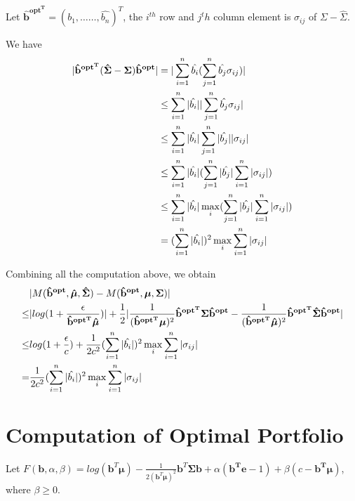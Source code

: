 \documentclass{gapd}
\begin{document}
Let $\mathbf{\hat{b}^{{opt}^T}}=(\hat{b_1},\dots \dots,\hat{b_n})^T$, the $i^{th}$  row and $j^th$  column element is $\sigma_{ij}$ of $\Sigma-\hat{\Sigma}$.

We have
\begin{equation}
\begin{aligned}
|\mathbf{\hat{b}^{{opt}^T}}(\boldsymbol{\hat{\Sigma}}-\boldsymbol{\Sigma})\mathbf{\hat{b}^{opt}}|&=|\sum_{i=1}^n \hat{b_i}(\sum_{j=1}^n\hat{b_j}\sigma_{ij})|\\
& \le \sum_{i=1}^n |\hat{b_i}| |\sum_{j=1}^n\hat{b_j}\sigma_{ij}|\\
& \le \sum_{i=1}^n |\hat{b_i}| \sum_{j=1}^n|\hat{b_j}||\sigma_{ij}|\\
& \le \sum_{i=1}^n |\hat{b_i}| (\sum_{j=1}^n|\hat{b_j}|\sum_{i=1}^n|\sigma_{ij}|)\\
& \le \sum_{i=1}^n |\hat{b_i}| \max_i(\sum_{j=1}^n|\hat{b_j}|\sum_{i=1}^n|\sigma_{ij}|)\\
& = (\sum_{i=1}^n |\hat{b_i}|)^2 \max_i \sum_{i=1}^n|\sigma_{ij}|
\end{aligned}\notag
\end{equation}

Combining all the computation above, we obtain
\begin{equation}
\begin{aligned}
&|M(\mathbf{\hat{b}^{opt}},\boldsymbol{\hat{\mu}},\boldsymbol{\hat{\Sigma}})-M(\mathbf{\hat{b}^{opt}},\boldsymbol{\mu},\boldsymbol{\Sigma})|\\
\le &|log(1+\frac{\epsilon}{\mathbf{\hat{b}^{{opt}^T}} \boldsymbol{\hat{\mu}}})|+ \frac{1}{2}|\frac{1}{(\mathbf{\hat{b}^{{opt}^T}}\boldsymbol{\mu})^2}\mathbf{\hat{b}^{{opt}^T}}\boldsymbol{\Sigma}\mathbf{\hat{b}^{opt}}-\frac{1}{(\mathbf{\hat{b}^{{opt}^T}}\boldsymbol{\hat{\mu}})^2}\mathbf{\hat{b}^{{opt}^T}}\boldsymbol{\hat{\Sigma}}\mathbf{\hat{b}^{opt}}|\\
\le & log(1+\frac{\epsilon}{c})+ \frac{1}{2c^2}(\sum_{i=1}^n |\hat{b_i}|)^2 \max_i \sum_{i=1}^n|\sigma_{ij}|\\
= & \frac{1}{2c^2}(\sum_{i=1}^n |\hat{b_i}|)^2 \max_i \sum_{i=1}^n|\sigma_{ij}|
\end{aligned}\notag
\end{equation}

\section{Computation of Optimal Portfolio}

Let $F(\mathbf{b},\alpha, \beta)=log(\mathbf{b}^T \boldsymbol{\mu})-\frac{1}{2(\mathbf{b}^T\boldsymbol{\mu})^2}\mathbf{b}^T\mathbf{\Sigma}\mathbf{b} + \alpha (\mathbf{b^Te}-1)+\beta(c-\mathbf{b^T\mu})$, where $\beta \ge 0$.
\end{document}
